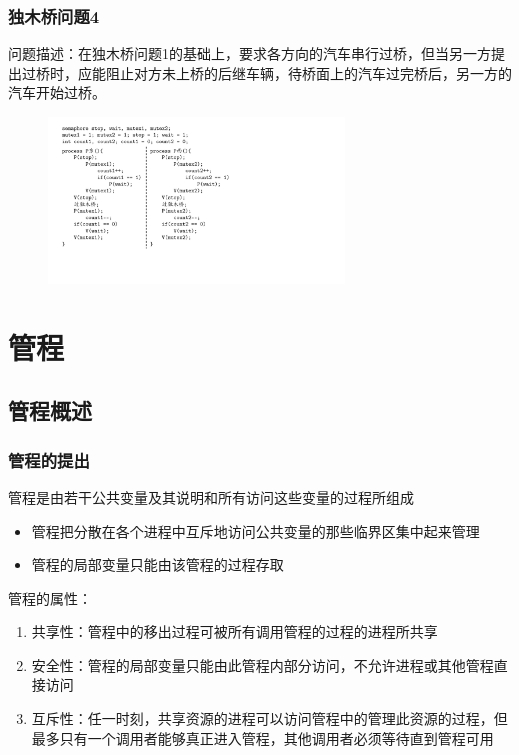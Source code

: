 \documentclass[cs4size,a4paper,10pt]{ctexart}
\begin{document}
	\subsubsection{独木桥问题4}
	问题描述：在独木桥问题1的基础上，要求各方向的汽车串行过桥，但当另一方提出过桥时，应能阻止对方未上桥的后继车辆，待桥面上的汽车过完桥后，另一方的汽车开始过桥。

	\begin{figure}[H]
		\centering
		\includegraphics[width=0.7\textwidth]{img/独木桥问题4.pdf}
	\end{figure}


	\section{管程}
	\subsection{管程概述}

	\subsubsection{管程的提出}
	管程是由若干公共变量及其说明和所有访问这些变量的过程所组成
	\begin{itemize}
		\item 管程把分散在各个进程中互斥地访问公共变量的那些临界区集中起来管理
		\item 管程的局部变量只能由该管程的过程存取
	\end{itemize}

	管程的属性：
	\begin{enumerate}[label=\arabic*.]
		\item 共享性：管程中的移出过程可被所有调用管程的过程的进程所共享
		\item 安全性：管程的局部变量只能由此管程内部分访问，不允许进程或其他管程直接访问
		\item 互斥性：任一时刻，共享资源的进程可以访问管程中的管理此资源的过程，但最多只有一个调用者能够真正进入管程，其他调用者必须等待直到管程可用
	\end{enumerate}
\end{document}
